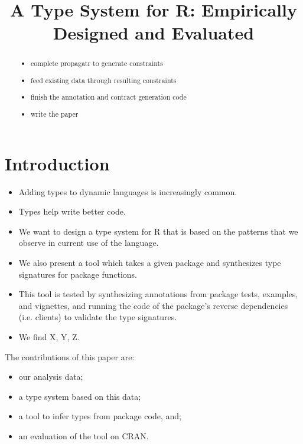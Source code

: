 \documentclass[sigplan,10pt,review,anonymous]{acmart}\settopmatter{printfolios=true,printccs=false,printacmref=false}
\begin{document}
\title{A Type System for R: Empirically Designed and Evaluated}

\begin{abstract}


\begin{itemize}

\item complete propagatr to generate constraints

\item feed existing data through resulting constraints

\item finish the annotation and contract generation code

\item write the paper

\end{itemize}

\end{abstract}

\maketitle

%
%
%
%
%
%
\section{Introduction}

\begin{itemize}
  \item Adding types to dynamic languages is increasingly common.
  \item Types help write better code.
  \item We want to design a type system for R that is based on the patterns that we observe in current use of the language. 
  \item We also present a tool which takes a given package and synthesizes type signatures for package functions.
  \item This tool is tested by synthesizing annotations from package tests, examples, and vignettes, and running the code of the package's reverse dependencies (i.e. clients) to validate the type signatures.
  \item We find X, Y, Z.
\end{itemize}

The contributions of this paper are:

\begin{itemize}

\item our analysis data;
\item a type system based on this data;
\item a tool to infer types from package code, and;
\item an evaluation of the tool on  CRAN.

\end{itemize}
\end{document}
